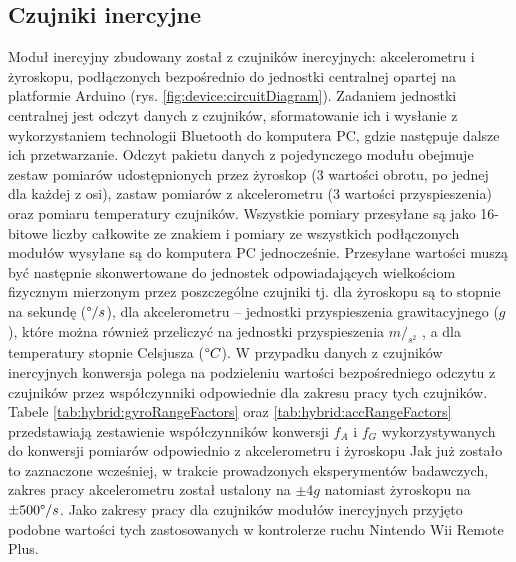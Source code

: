 \subsection{Czujniki inercyjne}
Moduł inercyjny zbudowany został z czujników inercyjnych: akcelerometru i żyroskopu, podłączonych bezpośrednio do jednostki centralnej opartej na platformie Arduino (rys. \ref{fig:device:circuitDiagram}). Zadaniem jednostki centralnej jest odczyt danych z czujników, sformatowanie ich i wysłanie z wykorzystaniem technologii Bluetooth do komputera PC, gdzie następuje dalsze ich przetwarzanie. Odczyt pakietu danych z pojedynczego modułu obejmuje zestaw pomiarów udostępnionych przez żyroskop (3 wartości obrotu, po jednej dla każdej z osi), zastaw pomiarów z akcelerometru (3 wartości przyspieszenia) oraz pomiaru temperatury czujników. Wszystkie pomiary przesyłane są jako 16-bitowe liczby całkowite ze znakiem i pomiary ze wszystkich podłączonych modułów wysyłane są do komputera PC jednocześnie. Przesyłane wartości muszą być następnie skonwertowane do jednostek odpowiadających wielkościom fizycznym mierzonym przez poszczególne czujniki tj. dla żyroskopu są to stopnie na sekundę ($\degree/s$), dla akcelerometru -- jednostki przyspieszenia grawitacyjnego ($g$), które można również przeliczyć na jednostki przyspieszenia $m/_{s^2}$
, a dla temperatury stopnie Celsjusza ($\degree C$). W przypadku danych z czujników inercyjnych konwersja polega na podzieleniu wartości bezpośredniego odczytu z czujników przez współczynniki odpowiednie dla zakresu pracy tych czujników. Tabele \ref{tab:hybrid:gyroRangeFactors} oraz \ref{tab:hybrid:accRangeFactors} przedstawiają zestawienie współczynników konwersji $f_A$ i $f_G$ wykorzystywanych do konwersji pomiarów odpowiednio z akcelerometru i żyroskopu 
Jak już zostało to zaznaczone wcześniej, w trakcie prowadzonych eksperymentów badawczych, zakres pracy akcelerometru został ustalony na $\pm4g$ natomiast żyroskopu na $\pm500\degree/s$. Jako zakresy pracy dla czujników modułów inercyjnych przyjęto podobne wartości tych zastosowanych w kontrolerze ruchu Nintendo Wii Remote Plus. 

